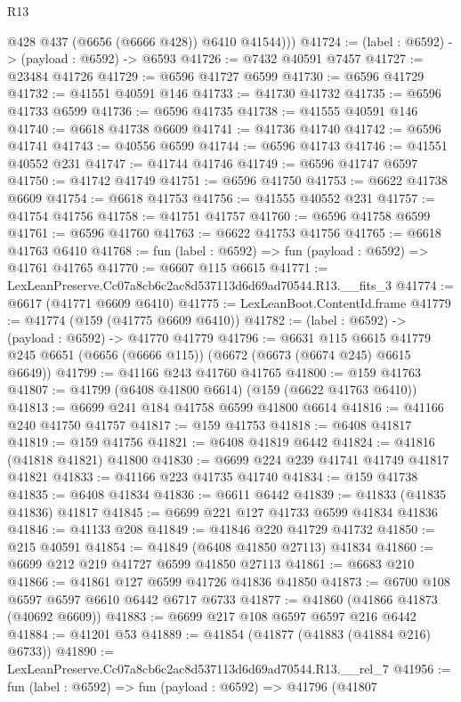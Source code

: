 \begin{lexlean}{R13}
\begin{coremodule}
          @428
          @437
          (@6656 (@6666 @428))
          @6410
          @41544)))
@41724 := (label : @6592) -> (payload : @6592) -> @6593
@41726 := @7432 @40591 @7457
@41727 := @23484 @41726
@41729 := @6596 @41727 @6599
@41730 := @6596 @41729
@41732 := @41551 @40591 @146
@41733 := @41730 @41732
@41735 := @6596 @41733 @6599
@41736 := @6596 @41735
@41738 := @41555 @40591 @146
@41740 := @6618 @41738 @6609
@41741 := @41736 @41740
@41742 := @6596 @41741
@41743 := @40556 @6599
@41744 := @6596 @41743
@41746 := @41551 @40552 @231
@41747 := @41744 @41746
@41749 := @6596 @41747 @6597
@41750 := @41742 @41749
@41751 := @6596 @41750
@41753 := @6622 @41738 @6609
@41754 := @6618 @41753
@41756 := @41555 @40552 @231
@41757 := @41754 @41756
@41758 := @41751 @41757
@41760 := @6596 @41758 @6599
@41761 := @6596 @41760
@41763 := @6622 @41753 @41756
@41765 := @6618 @41763 @6410
@41768 := fun (label : @6592) => fun (payload : @6592) => @41761 @41765
@41770 := @6607 @115 @6615
@41771 := LexLeanPreserve.Cc07a8cb6c2ac8d537113d6d69ad70544.R13.__fits_3
@41774 := @6617 (@41771 @6609 @6410)
@41775 := LexLeanBoot.ContentId.frame
@41779 := @41774 (@159 (@41775 @6609 @6410))
@41782 := (label : @6592) -> (payload : @6592) -> @41770 @41779
@41796 := @6631
    @115
    @6615
    @41779
    @245
    @6651
    (@6656 (@6666 @115))
    (@6672 (@6673 (@6674 @245) @6615 @6649))
@41799 := @41166 @243 @41760 @41765
@41800 := @159 @41763
@41807 := @41799 (@6408 @41800 @6614) (@159 (@6622 @41763 @6410))
@41813 := @6699 @241 @184 @41758 @6599 @41800 @6614
@41816 := @41166 @240 @41750 @41757
@41817 := @159 @41753
@41818 := @6408 @41817
@41819 := @159 @41756
@41821 := @6408 @41819 @6442
@41824 := @41816 (@41818 @41821) @41800
@41830 := @6699 @224 @239 @41741 @41749 @41817 @41821
@41833 := @41166 @223 @41735 @41740
@41834 := @159 @41738
@41835 := @6408 @41834
@41836 := @6611 @6442
@41839 := @41833 (@41835 @41836) @41817
@41845 := @6699 @221 @127 @41733 @6599 @41834 @41836
@41846 := @41133 @208
@41849 := @41846 @220 @41729 @41732
@41850 := @215 @40591
@41854 := @41849 (@6408 @41850 @27113) @41834
@41860 := @6699 @212 @219 @41727 @6599 @41850 @27113
@41861 := @6683 @210
@41866 := @41861 @127 @6599 @41726 @41836 @41850
@41873 := @6700 @108 @6597 @6597 @6610 @6442 @6717 @6733
@41877 := @41860 (@41866 @41873 (@40692 @6609))
@41883 := @6699 @217 @108 @6597 @6597 @216 @6442
@41884 := @41201 @53
@41889 := @41854 (@41877 (@41883 (@41884 @216) @6733))
@41890 := LexLeanPreserve.Cc07a8cb6c2ac8d537113d6d69ad70544.R13.__rel_7
@41956 := fun (label : @6592) =>
  fun (payload : @6592) =>
  @41796
    (@41807

\end{coremodule}
\end{lexlean}
